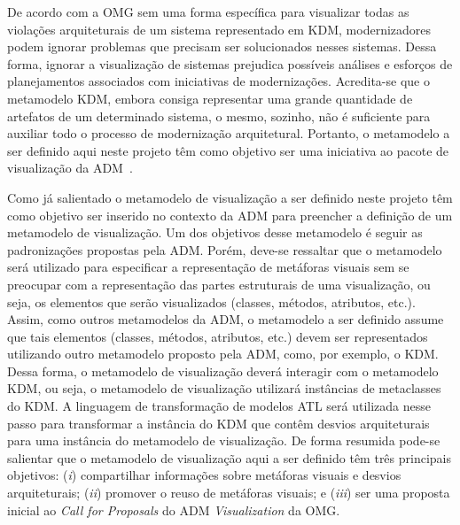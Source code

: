 \documentclass[12pt]{article}
\begin{document}
De acordo com a OMG sem uma forma específica para visualizar todas as violações arquiteturais de um sistema representado em KDM, modernizadores podem ignorar problemas que precisam ser solucionados nesses sistemas. Dessa forma, ignorar a visualização de sistemas prejudica possíveis análises e esforços de planejamentos associados com iniciativas de modernizações. Acredita-se que o metamodelo KDM, embora consiga representar uma grande quantidade de artefatos de um determinado sistema, o mesmo, sozinho, não é suficiente para auxiliar todo o processo de modernização arquitetural. Portanto, o metamodelo a ser definido aqui neste projeto têm como objetivo ser uma iniciativa ao pacote de visualização da ADM~\cite{ADM:visualization}.

Como já salientado o metamodelo de visualização a ser definido neste projeto têm como objetivo ser inserido no contexto da ADM para preencher a definição de um metamodelo de visualização. Um dos objetivos desse metamodelo é seguir as padronizações propostas pela ADM. Porém, deve-se ressaltar que o metamodelo será utilizado para especificar a representação de metáforas visuais sem se preocupar com a representação das partes estruturais de uma visualização, ou seja, os elementos que serão visualizados (classes, métodos, atributos, etc.). Assim, como outros metamodelos da ADM, o metamodelo a ser definido assume que tais elementos (classes, métodos, atributos, etc.) devem ser representados utilizando outro metamodelo proposto pela ADM, como, por exemplo, o KDM. Dessa forma, o metamodelo de visualização deverá interagir com o metamodelo KDM, ou seja, o metamodelo de visualização utilizará instâncias de metaclasses do KDM. A linguagem de transformação de modelos ATL será utilizada nesse passo para transformar a instância do KDM que contêm desvios arquiteturais para uma instância do metamodelo de visualização.  De forma resumida pode-se salientar que o metamodelo de visualização aqui a ser definido têm três principais objetivos: (\textit{i}) compartilhar informações sobre metáforas visuais e desvios arquiteturais; (\textit{ii}) promover o reuso de metáforas visuais; e (\textit{iii}) ser uma proposta inicial ao \textit{Call for Proposals} do ADM \textit{Visualization} da OMG. 
\end{document}
